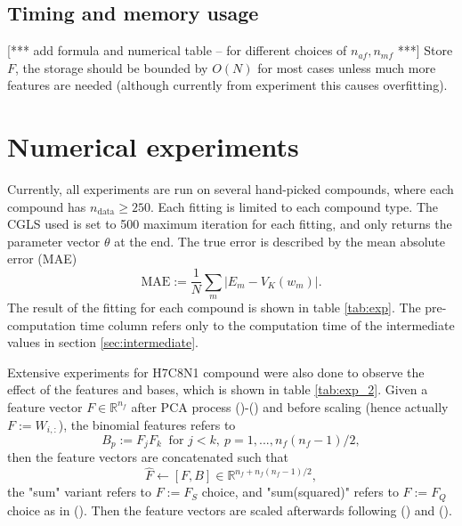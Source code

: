 \documentclass[12pt]{article}
\def\att{                    %
        \marginpar[ \hspace*{\fill} \raisebox{-0.2em}{\rule{2mm}{1.2em}} ]
        {\raisebox{-0.2em}{\rule{2mm}{1.2em}} }
        }
\def\at#1{[*** \att #1 ***]}  %
\begin{document}
\subsection{Timing and memory usage}
\at{add formula and numerical table -- for different choices of $n_{af}, n_{mf}$}
Store $F$, the storage should be bounded by $O(N)$ for most cases unless much more features are needed (although currently from experiment this causes overfitting).

\section{Numerical experiments}
Currently, all experiments are run on several hand-picked compounds, where each compound has $n_\text{data} \geq 250$. 
Each fitting is limited to each compound type. The CGLS used is set to 500 maximum iteration for each fitting, and only returns the parameter vector $\theta$ at the end.
The true error is described by the mean absolute error (MAE)
\begin{equation}
	\text{MAE} := \frac{1}{N}\sum_m|E_{m} - V_K(w_m)|.
\end{equation}
The result of the fitting for each compound is shown in table \ref{tab:exp}. The pre-computation time column refers only to the computation time of the intermediate values in section \ref{sec:intermediate}. 

Extensive experiments for H7C8N1 compound were also done to observe the effect of the features and bases, which is shown in table \ref{tab:exp_2}. Given a feature vector $F \in \mathbb{R}^{n_f} $ after PCA process ()-() and before scaling (hence actually $F:=W_{i,:}$), the binomial features refers to
\begin{equation}
	B_{p} := F_{j}F_{k} ~ \text{ for } j<k, ~ p = 1,...,n_f(n_f-1)/2,
\end{equation}
then the feature vectors are concatenated such that
\begin{equation}
	\hat{F} \leftarrow [F, B] \in \mathbb{R}^{n_f+n_f(n_f-1)/2},
\end{equation}
the "sum" variant refers to $F := F_S$ choice, and "sum(squared)" refers to $F := F_Q$ choice as in (). Then the feature vectors are scaled afterwards following () and ().
\end{document}
